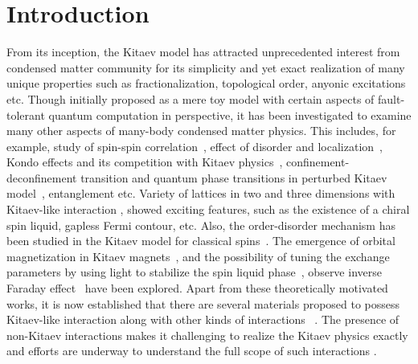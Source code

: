\documentclass[aps,amsmath,twocolumn,amssymb,floatfix,showpacs,superscriptaddress,nofootinbib,longbibliography]{revtex4-1}
\begin{document}
\section{Introduction}\label{intro}
From its inception, the Kitaev model\cite{kitaev-2006} has attracted unprecedented interest from condensed matter community for its simplicity and yet exact realization of many unique properties such as fractionalization, topological order, anyonic excitations etc.  Though initially proposed as a mere toy model with certain aspects of fault-tolerant quantum computation in perspective, it has  been investigated to examine many other aspects of many-body condensed matter physics. This includes, for example, study of spin-spin correlation~\cite{smandal-2007,tikhonov-2011,lunkin-2019}, effect of disorder and localization~\cite{kao-2021,nasu-2020}, Kondo effects and its competition with Kitaev physics~\cite{tathagata-2020}, confinement-deconfinement transition and quantum phase transitions in perturbed Kitaev model~\cite{saptarshi-2011,animesh-2020,animesh-2021, knolle-2018}, entanglement \cite{yaoentanglement,mandalentanglement} etc. Variety of lattices in two and three dimensions with Kitaev-like interaction \cite{kivelson-2007,vala-csl-2010,naveen-2008,eschmann-2020}, showed exciting features, such as the existence of a chiral spin liquid, gapless Fermi contour, etc. Also, the order-disorder mechanism has been studied in the Kitaev model for classical spins~\cite{baskaran-2008,samarth-2010}. The emergence of orbital magnetization in Kitaev magnets~\cite{saikat-lin}, and the possibility of tuning the exchange parameters by using light to stabilize the spin liquid phase~\cite{Kumar2022}, observe inverse Faraday effect~\cite{saikat-inverseFARADAY} have been explored. Apart from these theoretically motivated works, it is now established that there are several materials proposed to possess Kitaev-like interaction along with other kinds of interactions ~\cite{chalaupka-2010,simon-2022,takagi-2019,motome-2020,hermanns-2018,abanerjee-2016}. The presence of non-Kitaev interactions makes it challenging to realize the Kitaev physics exactly and efforts are underway to understand the full scope of such interactions \cite{janssen-2017,chern-2021,czajka-2021,niravkumar-2019,wulferding-2020,berke-prb-2020,haoxiang-nature-2012,balz-prb-2021,plessis-2020,sananda-2019,sananda-2021}.
\\\\\indent
\end{document}
